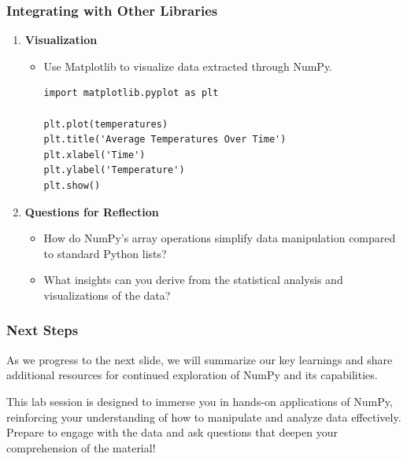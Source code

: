 \documentclass{beamer}
\begin{document}
\begin{frame}[fragile]
    \frametitle{Integrating with Other Libraries}
    \begin{enumerate}
        \item \textbf{Visualization}
        \begin{itemize}
            \item Use Matplotlib to visualize data extracted through NumPy.
            \begin{lstlisting}
import matplotlib.pyplot as plt

plt.plot(temperatures)
plt.title('Average Temperatures Over Time')
plt.xlabel('Time')
plt.ylabel('Temperature')
plt.show()
            \end{lstlisting}
        \end{itemize}
        
        \item \textbf{Questions for Reflection}
        \begin{itemize}
            \item How do NumPy's array operations simplify data manipulation compared to standard Python lists?
            \item What insights can you derive from the statistical analysis and visualizations of the data?
        \end{itemize}
    \end{enumerate}
\end{frame}

\begin{frame}
    \frametitle{Next Steps}
    As we progress to the next slide, we will summarize our key learnings and share additional resources for continued exploration of NumPy and its capabilities.
    
    This lab session is designed to immerse you in hands-on applications of NumPy, reinforcing your understanding of how to manipulate and analyze data effectively. Prepare to engage with the data and ask questions that deepen your comprehension of the material!
\end{frame}
\end{document}
